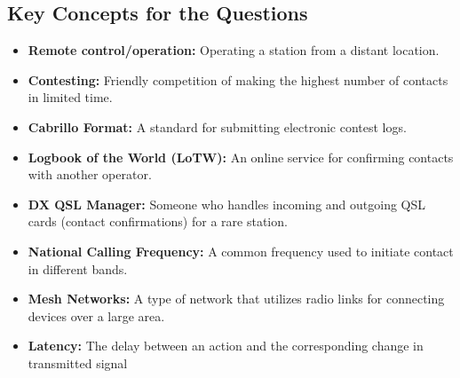 
\subsection*{Key Concepts for the Questions}
\begin{itemize}
    \item \textbf{Remote control/operation:} Operating a station from a distant location.
    \item \textbf{Contesting:}  Friendly competition of making the highest number of contacts in limited time.
     \item \textbf{Cabrillo Format:} A standard for submitting electronic contest logs.
     \item \textbf{Logbook of the World (LoTW):} An online service for confirming contacts with another operator.
    \item \textbf{DX QSL Manager:} Someone who handles incoming and outgoing QSL cards (contact confirmations) for a rare station.
    \item \textbf{National Calling Frequency:}  A common frequency used to initiate contact in different bands.
     \item \textbf{Mesh Networks:} A type of network that utilizes radio links for connecting devices over a large area.
    \item  \textbf{Latency:} The delay between an action and the corresponding change in transmitted signal

\end{itemize}

